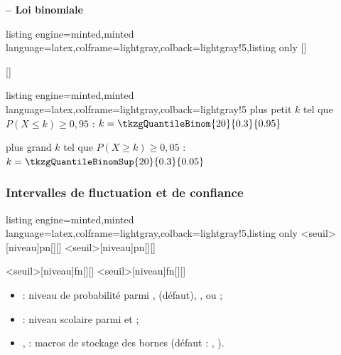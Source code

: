 \documentclass[11pt,a4paper]{ltxdoc}
\begin{document}
\textbf{-- Loi binomiale}

\begin{tcblisting}{listing engine=minted,minted language=latex,colframe=lightgray,colback=lightgray!5,listing only}
[\macro]

[\macro]
\end{tcblisting}

\begin{tcblisting}{listing engine=minted,minted language=latex,colframe=lightgray,colback=lightgray!5}
plus petit $k$ tel que $P(X \leqslant k) \geqslant 0{,}95$ :
$k = \tkzgQuantileBinom{20}{0.3}{0.95}$

plus grand $k$ tel que $P(X \geqslant k) \geqslant 0{,}05$ :
$k = \tkzgQuantileBinomSup{20}{0.3}{0.05}$
\end{tcblisting}

\subsubsection{Intervalles de fluctuation et de confiance}

\begin{tcblisting}{listing engine=minted,minted language=latex,colframe=lightgray,colback=lightgray!5,listing only}
\tkzgCalcIntFluctu<seuil>[niveau]{p}{n}[\borneinf][\bornesup]
\tkzgCalcIntFluctu*<seuil>[niveau]{p}{n}[\borneinf][\bornesup]

\tkzgCalcIntConf<seuil>[niveau]{f}{n}[\borneinf][\bornesup]
\tkzgCalcIntConf*<seuil>[niveau]{f}{n}[\borneinf][\bornesup]
\end{tcblisting}

\begin{itemize}
  \item {} : niveau de probabilité parmi ,  (défaut), , ou  ;
  \item \MontreCode{[niveau]} : niveau scolaire parmi  et  ;
  \item {},  : macros de stockage des bornes (défaut : , ).
\end{itemize}
\end{document}
